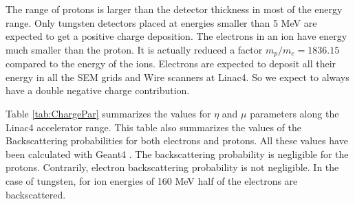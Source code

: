 The range of protons is larger than the detector thickness in most of the energy range. Only tungsten detectors placed at energies smaller than 5  \si[]{\mega\electronvolt} are expected to get a positive charge deposition. The electrons in an \hm ion have energy much smaller than the proton. It is actually reduced a factor $m_p / m_e = 1836.15$ compared to the energy of the \hm ions.  Electrons are expected to deposit all their energy in all the SEM grids and Wire scanners at Linac4. So we expect to always have a double negative charge contribution. 

Table \ref{tab:ChargePar} summarizes the values for $\eta$ and $\mu$ parameters along the Linac4 accelerator range. This table also summarizes the values of the Backscattering probabilities for both electrons and protons. All these values have been calculated with Geant4 \parencite[][]{ref:Geant4}. The backscattering probability is negligible for the protons. Contrarily, electron backscattering probability is not negligible. In the case of tungsten, for ion energies of 160 MeV half of the electrons are backscattered.

